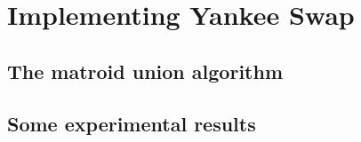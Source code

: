 \chapter{Implementing Yankee Swap}
\label{chap:yankee-swap}
\skelpar
\section{The matroid union algorithm}
\skelpar
\section{Some experimental results}
\skelpar